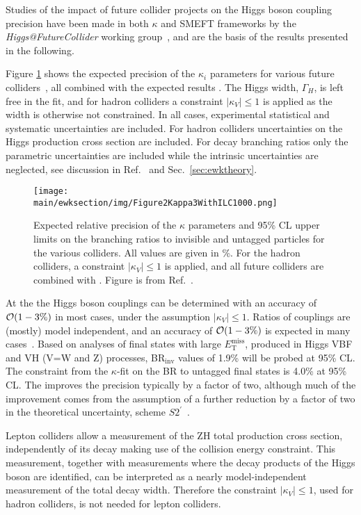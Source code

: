 \documentclass[../report.tex]{subfiles}
\providecommand{\main}{..}
\newcommand{\etmiss}{E_\textrm{T}^\textrm{miss}}
\begin{document}
Studies of the impact of future collider projects on the Higgs boson coupling precision have been made in both $\kappa$ and SMEFT frameworks by the \textit{Higgs@FutureCollider} working group~\cite{deBlas:2019rxi}, and are the basis of the results presented in the following.

Figure \ref{fig:Kappa3Summary} shows the expected precision of the $\kappa_i$ parameters for various future colliders~\cite{deBlas:2019rxi}, all combined with the expected \HLLHC results \cite{Cepeda:2019klc}. 
The Higgs width, $\Gamma_H$, is left free in the fit, and for hadron colliders a constraint $|\kappa_V|\leq 1$ is applied as the width is otherwise not constrained.
In all cases, experimental statistical and systematic uncertainties are included. For hadron colliders uncertainties on the Higgs production cross section are included. For decay branching ratios only the parametric uncertainties are included while the intrinsic uncertainties are neglected, see discussion in Ref.~\cite{deBlas:2019rxi} and Sec.~\ref{sec:ewktheory}.

\begin{figure}[t]
\centering
\texttt{[image: \\main/ewksection/img/Figure2Kappa3WithILC1000.png]}
\caption{\label{fig:Kappa3Summary}
Expected relative precision of the $\kappa$ parameters and 95\% CL upper limits on the branching ratios to invisible and untagged particles for the various colliders. All values are given in \%. For the hadron colliders, a constraint $|\kappa_V|\leq 1$ is applied, and all future colliders are combined with \HLLHC. Figure is from Ref.~\cite{deBlas:2019rxi}.
}
\end{figure}

At the \HLLHC the Higgs boson couplings can be determined with an accuracy of ${\cal O}(1-3\%)$ in most cases, under the assumption $|\kappa_V| \leq 1$. Ratios of couplings are (mostly) model independent, and an accuracy of ${\cal O}(1-3\%)$ is expected in many cases~\cite{Cepeda:2019klc}.
Based on analyses of final states with large $\etmiss$, produced in Higgs VBF and VH (V=W and Z) processes, BR$_\textrm{inv}$ values of 1.9\% will be probed at 95\% CL. The constraint from the $\kappa$-fit on the BR to untagged final states is 4.0\% at 95\% CL. The \HELHC improves the precision typically by a factor of two, although much of the improvement comes from the assumption 
of a further reduction by a factor of two in the theoretical uncertainty, scheme $S2^{\prime}$~\cite{Cepeda:2019klc}.

Lepton colliders allow a measurement of the ZH total production cross section, independently of its decay making use of the collision energy constraint. This measurement, together with measurements where the decay products of the Higgs boson are identified, can be interpreted as a nearly model-independent measurement of the total decay width. Therefore the constraint $|\kappa_V| \leq 1$, used for hadron colliders, is not needed for lepton colliders. 
\end{document}
